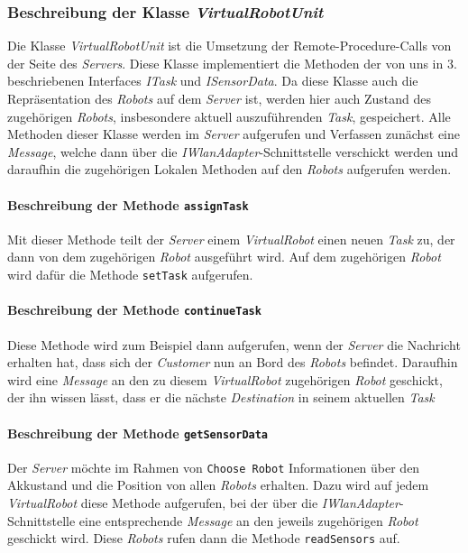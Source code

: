 	\subsubsection{Beschreibung der Klasse \textit{VirtualRobotUnit}}
	Die Klasse \textit{VirtualRobotUnit} ist die Umsetzung der Remote-Procedure-Calls von der Seite des \textit{Servers}. Diese Klasse implementiert die Methoden der von uns in 3. beschriebenen Interfaces \textit{ITask} und \textit{ISensorData}. Da diese Klasse auch die Repräsentation des \textit{Robots} auf dem \textit{Server} ist, werden hier auch Zustand des zugehörigen \textit{Robots}, insbesondere aktuell auszuführenden \textit{Task}, gespeichert. Alle Methoden dieser Klasse werden im \textit{Server} aufgerufen und Verfassen zunächst eine \textit{Message}, welche dann über die \textit{IWlanAdapter}-Schnittstelle verschickt werden und daraufhin die zugehörigen Lokalen Methoden auf den \textit{Robots} aufgerufen werden.
	
			\paragraph{Beschreibung der Methode \texttt{assignTask}}
			Mit dieser Methode teilt der \textit{Server} einem \textit{VirtualRobot} einen neuen \textit{Task} zu, der dann von dem zugehörigen \textit{Robot} ausgeführt wird. Auf dem zugehörigen \textit{Robot} wird dafür die Methode \texttt{setTask} aufgerufen.
			
			\paragraph{Beschreibung der Methode \texttt{continueTask}}
			Diese Methode wird zum Beispiel dann aufgerufen, wenn der \textit{Server} die Nachricht erhalten hat, dass sich der \textit{Customer} nun an Bord des \textit{Robots} befindet. Daraufhin wird eine \textit{Message} an den zu diesem \textit{VirtualRobot} zugehörigen \textit{Robot} geschickt, der ihn wissen lässt, dass er die nächste \textit{Destination} in seinem aktuellen \textit{Task}			
			
			\paragraph{Beschreibung der Methode \texttt{getSensorData}}
			Der \textit{Server} möchte im Rahmen von \texttt{Choose Robot} Informationen über den Akkustand und die Position von allen \textit{Robots} erhalten. Dazu wird auf jedem \textit{VirtualRobot} diese Methode aufgerufen, bei der über die \textit{IWlanAdapter}-Schnittstelle eine entsprechende \textit{Message} an den jeweils zugehörigen \textit{Robot} geschickt wird. Diese \textit{Robots} rufen dann die Methode \texttt{readSensors} auf.